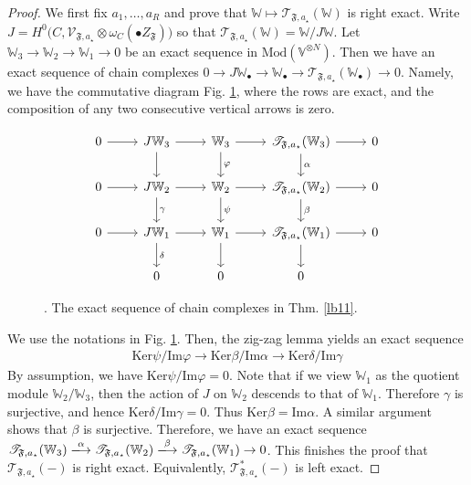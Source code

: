 \documentclass[11pt,b5paper,notitlepage]{article}
\theoremstyle{definition}
\theoremstyle{plain}
\newcommand{\SV}{\mathscr{V}}
\newcommand{\blt}{\bullet}
\newcommand{\Vbb}{\mathbb V}
\newcommand{\Wbb}{\mathbb W}
\newcommand{\Ker}{\mathrm{Ker}}
\newcommand{\<}{\left\langle}
\renewcommand{\>}{\right\rangle}
\newcommand{\ST}{\mathscr{T}}
\newcommand{\Mod}{\mathrm{Mod}}
\newcommand{\ff}{\mathfrak{F}}
\newcommand{\Imag}{\mathrm{Im}}
\numberwithin{equation}{section}
\begin{document}
\begin{proof}
We first fix $a_1,\dots,a_R$ and prove that $\Wbb\mapsto \ST_{\ff,a_\star}(\Wbb)$ is right exact. Write $J=H^0\big(C,\SV_{\ff,a_\star}\otimes \omega_{C}(\blt Z_\ff)\big)$ so that $\ST_{\ff,a_\star}(\Wbb)=\Wbb/J\Wbb$.  Let $\Wbb_3\rightarrow\Wbb_2\rightarrow\Wbb_1\rightarrow 0$ be an exact sequence in $\Mod(\Vbb^{\otimes N})$. Then we have an exact sequence of chain complexes $0\rightarrow J\Wbb_\blt\rightarrow \Wbb_\blt\rightarrow \ST_{\ff,a_\star}(\Wbb_\blt)\rightarrow0$. Namely, we have the commutative diagram Fig. \ref{fig1}, where the rows are exact, and the composition of any two consecutive vertical arrows is zero.
\begin{figure}[h]
	\centering
\begin{equation*}
\begin{tikzcd}
0 \arrow[r] & J\Wbb_3 \arrow[r] \arrow[d] & \Wbb_3 \arrow[r] \arrow[d,"\varphi"] & \ST_{\ff,a_\star}(\Wbb_3) \arrow[r] \arrow[d,"\alpha"] & 0 \\
0 \arrow[r] & J\Wbb_2 \arrow[r] \arrow[d,"\gamma"] & \Wbb_2 \arrow[r] \arrow[d,"\psi"] & \ST_{\ff,a_\star}(\Wbb_2) \arrow[r] \arrow[d,"\beta"] & 0 \\
0 \arrow[r] & J\Wbb_1 \arrow[r] \arrow[d,"\delta"] & \Wbb_1 \arrow[r] \arrow[d] & \ST_{\ff,a_\star}(\Wbb_1) \arrow[r] \arrow[d] & 0 \\
            & 0                     & 0                     & 0                     &  
\end{tikzcd}
\end{equation*}
	\caption{. The exact sequence of chain complexes in Thm. \ref{lb11}.}
	\label{fig1}
\end{figure} 

We use the notations in Fig. \ref{fig1}. Then, the zig-zag lemma yields an exact sequence
\begin{align*}
\Ker\psi/\Imag\varphi\rightarrow \Ker\beta/\Imag\alpha\rightarrow\Ker\delta/\Imag\gamma
\end{align*}
By assumption, we have $\Ker\psi/\Imag\varphi=0$. Note that if we view $\Wbb_1$ as the quotient module $\Wbb_2/\Wbb_3$, then the action of $J$ on $\Wbb_2$ descends to that of $\Wbb_1$. Therefore $\gamma$ is surjective, and hence $\Ker\delta/\Imag\gamma=0$. Thus $\Ker\beta=\Imag\alpha$. A similar argument shows that $\beta$ is surjective. Therefore, we have an exact sequence $\ST_{\ff,a_\star}(\Wbb_3)\xlongrightarrow{\alpha}\ST_{\ff,a_\star}(\Wbb_2)\xlongrightarrow{\beta}\ST_{\ff,a_\star}(\Wbb_1)\rightarrow0$. This finishes the proof that $\ST_{\ff,a_\star}(-)$ is right exact. Equivalently, $\ST^*_{\ff,a_\star}(-)$ is left exact.



\end{proof}
\end{document}
